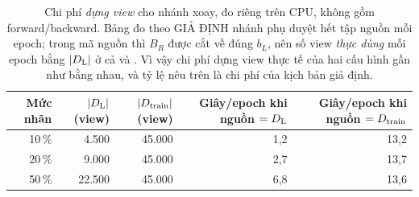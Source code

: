 \begin{table}[htbp]
  \centering
  \small
  \setlength{\tabcolsep}{6pt}
  \begin{tabular}{@{}r r r r r@{}}
    \toprule
    Mức nhãn & $|D_{\mathrm{L}}|$ (view) & $|D_{\mathrm{train}}|$ (view) & Giây/epoch khi nguồn $= D_{\mathrm{L}}$ & Giây/epoch khi nguồn $= D_{\mathrm{train}}$ \\
    \midrule
    10\,\% & 4.500 & 45.000 & 1,2 & 13,2 \\
    20\,\% & 9.000 & 45.000 & 2,7 & 13,7 \\
    50\,\% & 22.500 & 45.000 & 6,8 & 13,6 \\
    \bottomrule
  \end{tabular}
  \caption{Chi phí \emph{dựng view} cho nhánh xoay, đo riêng trên CPU, không gồm forward/backward. Bảng đo theo GIẢ ĐỊNH nhánh phụ duyệt hết tập nguồn mỗi epoch; trong mã nguồn thì $B_R$ được cắt về đúng $b_L$, nên số view \emph{thực dùng} mỗi epoch bằng $|D_{\mathrm{L}}|$ ở cả  và . Vì vậy chi phí dựng view thực tế của hai cấu hình gần như bằng nhau, và tỷ lệ nêu trên là chi phí của kịch bản giả định.}
  \label{tab:rotation-data-cost}
\end{table}
